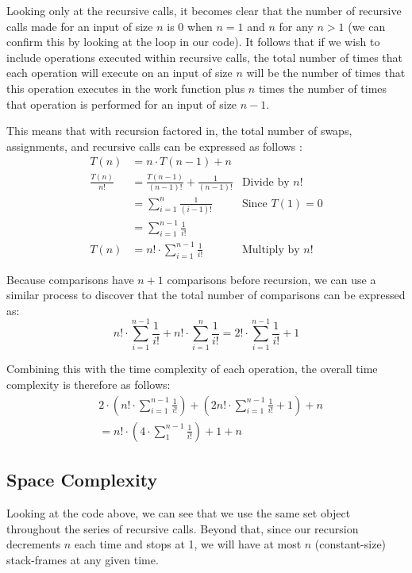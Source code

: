 \documentclass[10pt, oneside]{article}   	%
\begin{document}
Looking only at the recursive calls, it becomes clear that the number of recursive calls made for an input of size $n$ is 0 when $n = 1$ and $n$ for any $n > 1$ (we can confirm this by looking at the loop in our code). It follows that if we wish to include operations executed within recursive calls, the total number of times that each operation will execute on an input of size $n$ will be the number of times that this operation executes in the work function plus $n$ times the number of times that operation is performed for an input of size $n - 1$.

This means that with recursion factored in, the total number of swaps, assignments, and recursive calls can be expressed as follows \cite{siena}:
\begin{align*}
	T(n) &= n \cdot T(n - 1) + n \\
	\frac{T(n)}{n!} &= \frac{T(n - 1)}{(n - 1)!} + \frac{1}{(n - 1)!} &\text{Divide by $n!$} \\
	&= \sum_{i = 1}^{n} \frac{1}{(i - 1)!} &\text{Since $T(1) = 0$} \\
	&= \sum_{i = 1}^{n - 1} \frac{1}{i!} \\
	T(n) &= n! \cdot \sum_{i = 1}^{n - 1} \frac{1}{i!} &\text{Multiply by $n!$}
\end{align*}

Because comparisons have $n + 1$ comparisons before recursion, we can use a similar process to discover that the total number of comparisons can be expressed as:
\[
	n! \cdot \sum_{i = 1}^{n - 1} \frac{1}{i!} + n! \cdot \sum_{i = 1}^{n} \frac{1}{i!} = 2! \cdot \sum_{i = 1}^{n - 1} \frac{1}{i!} + 1
\]

Combining this with the time complexity of each operation, the overall time complexity is therefore as follows:
\begin{align*}
	&2 \cdot \left( n! \cdot \sum_{i = 1}^{n - 1} \frac{1}{i!} \right) + \left( 2n! \cdot \sum_{i = 1}^{n - 1} \frac{1}{i!} + 1 \right) + n \\
	&= n! \cdot \left( 4 \cdot \sum_{1}^{n - 1} \frac{1}{i!} \right) + 1 + n
\end{align*}

\subsection{Space Complexity}

Looking at the code above, we can see that we use the same set object throughout the series of recursive calls. Beyond that, since our recursion decrements $n$ each time and stops at 1, we will have at most $n$ (constant-size) stack-frames at any given time.
\end{document}
